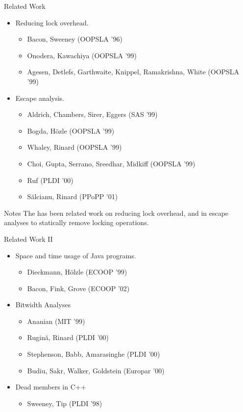 \documentclass[%
pdf,
colorBG,
slideColor,
nototal,
oqe
]{prosper}
\renewcommand{\yellow}{\colC}
\newenvironment{talknotes}{\begin{slide}{Notes}\tiny}{\end{slide}}
\begin{document}
\begin{slide}{Related Work}
\begin{itemize}
\item Reducing lock overhead.
\begin{itemize} \yellow\small %
\item Bacon, Sweeney (OOPSLA '96)
\item Onodera, Kawachiya (OOPSLA '99)
\item Agesen, Detlefs, Garthwaite, Knippel, Ramakrishna, White (OOPSLA '99)
\end{itemize}
\item Escape analysis.
\begin{itemize} \yellow\small %
\item Aldrich, Chambers, Sirer, Eggers (SAS '99)
\item Bogda, H\"ozle (OOPSLA '99)
\item Whaley, Rinard (OOPSLA '99)
\item Choi, Gupta, Serrano, Sreedhar, Midkiff (OOPSLA '99)
\item Ruf (PLDI '00)
\item S\u{a}lcianu, Rinard (PPoPP '01)
\end{itemize}
\end{itemize}
\end{slide}

\begin{talknotes}
The has been related work on reducing lock overhead, and in escape
analyses to statically remove locking operations.
\end{talknotes}

\begin{slide}{Related Work II}
\begin{itemize}
\item Space and time usage of Java programs.
\begin{itemize} \yellow\small%
\item Dieckmann, H\"olzle (ECOOP '99)
\item Bacon, Fink, Grove (ECOOP '02)
\end{itemize}
\item Bitwidth Analyses
\begin{itemize} \yellow\small%
\item Ananian (MIT '99)
\item Rugin\u{a}, Rinard (PLDI '00)
\item Stephenson, Babb, Amarasinghe (PLDI '00)
\item Budiu, Sakr, Walker, Goldstein (Europar '00)
\end{itemize}
\item Dead members in C++
\begin{itemize} \yellow\small%
\item Sweeney, Tip (PLDI '98)
\end{itemize}
\end{itemize}
\end{slide}
\end{document}
